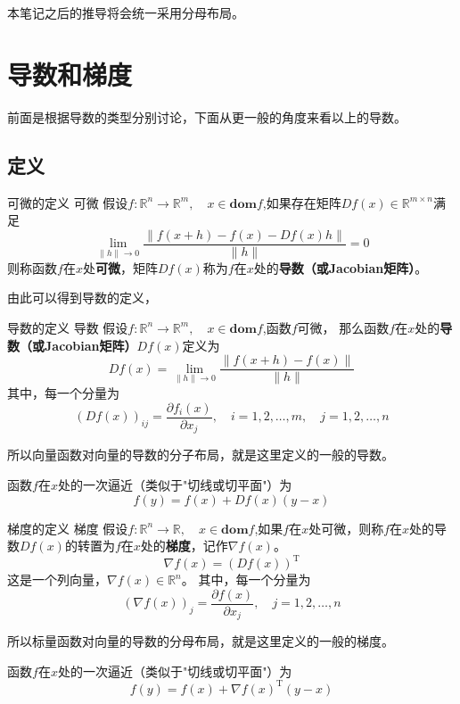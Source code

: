 \documentclass[withoutpreface,bwprint]{NoteBook}
\begin{document}
本笔记之后的推导将会统一采用分母布局。

\section{导数和梯度}
前面是根据导数的类型分别讨论，下面从更一般的角度来看以上的导数。
\subsection{定义}
\begin{definition}
    {可微的定义} %
    {可微} %
    假设$f:\mathbb{R}^n \rightarrow \mathbb{R}^m, \quad {x} \in \mathbf{dom}  f$,如果存在矩阵$Df(x) \in \mathbb{R}^{m \times n}$满足
    $$
        \lim_{\|h\| \to 0} \frac{\|f(x+h) - f(x) - Df(x)h\|}{\|h\|} = 0
    $$
    则称函数$f$在$x$处\textbf{可微}，矩阵$Df(x)$称为$f$在$x$处的\textbf{导数（或Jacobian矩阵）}。
\end{definition}

由此可以得到导数的定义，
\begin{definition}
    {导数的定义} %
    {导数} %
    假设$f:\mathbb{R}^n \rightarrow \mathbb{R}^m, \quad {x} \in \mathbf{dom}  f$,函数$f$可微，
    那么函数$f$在$x$处的\textbf{导数（或Jacobian矩阵）}$Df(x)$定义为
    $$
    Df(x)=\lim_{\|h\| \to 0} \frac{\|f(x+h) - f(x) \|}{\|h\|}
    $$
    其中，每一个分量为
    $$
        (Df(x))_{ij} = \frac{\partial f_i(x)}{\partial x_j}, \quad i=1,2,\dots,m, \quad j=1,2,\dots,n
    $$
\end{definition}

所以向量函数对向量的导数的分子布局，就是这里定义的一般的导数。

函数$f$在$x$处的一次逼近（类似于"切线或切平面"）为
$$
f(y)=f(x) + Df(x)(y-x)
$$

\begin{definition}
    {梯度的定义} %
    {梯度} %
    假设$f:\mathbb{R}^n \rightarrow \mathbb{R}, \quad {x} \in \mathbf{dom}  f$,如果$f$在$x$处可微，则称$f$在$x$处的导数$Df(x)$的转置为$f$在$x$处的\textbf{梯度}，记作$\nabla f(x)$。
    $$
        \nabla f(x) = (Df(x))^\mathrm{T}
    $$
    这是一个列向量，$\nabla f(x) \in \mathbb{R}^{n}$。
    其中，每一个分量为
    $$
        (\nabla f(x))_{j} = \frac{\partial f(x)}{\partial x_j}, \quad j=1,2,\dots,n
    $$
\end{definition}

所以标量函数对向量的导数的分母布局，就是这里定义的一般的梯度。

函数$f$在$x$处的一次逼近（类似于"切线或切平面"）为
$$
f(y)=f(x) + \nabla f(x)^\mathrm{T} (y-x)
$$
\end{document}
